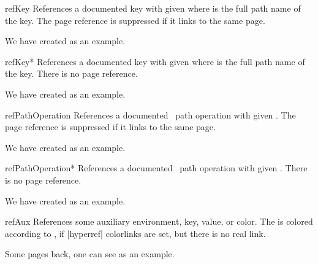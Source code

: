 \begin{docCommand}{refKey}{}
  References a documented key with given  where 
  is the full path name of the key.
  The page reference is suppressed if it links to the same page.
\begin{dispExample}
We have created  as an example.
\end{dispExample}
\end{docCommand}

\begin{docCommand}{refKey*}{}
  References a documented key with given  where 
  is the full path name of the key.
  There is no page reference.
\begin{dispExample}
We have created  as an example.
\end{dispExample}
\end{docCommand}

\clearpage

\begin{docCommand}[doc new=2019-09-17]{refPathOperation}{}
  References a documented \tikzname\ path operation with given .
  The page reference is suppressed if it links to the same page.
\begin{dispExample}
We have created  as an example.
\end{dispExample}
\end{docCommand}

\begin{docCommand}[doc new=2019-09-17]{refPathOperation*}{}
  References a documented \tikzname\ path operation with given .
  There is no page reference.
\begin{dispExample}
We have created  as an example.
\end{dispExample}
\end{docCommand}



\begin{docCommand}[doc updated=2020-02-11]{refAux}{}
  References some auxiliary environment, key, value, or color.
  The  is colored according to ,
  if |hyperref| colorlinks are set, but there is no real link.
\begin{dispExample}
Some pages back, one can see  as an example.
\end{dispExample}
\end{docCommand}

